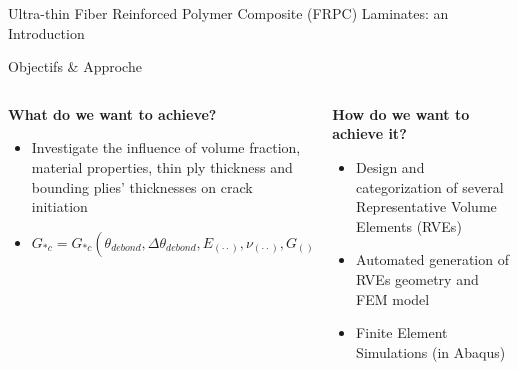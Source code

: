 \documentclass[final]{beamer}
\begin{document}
\begin{frame}
\begin{center}
\begin{minipage}{\textwidth}
\begin{block}{\rule[-0.6ex]{0pt}{50pt}\centering\LARGE Ultra-thin Fiber Reinforced Polymer Composite (FRPC) Laminates: an Introduction}
\end{block}
\end{minipage}
\end{center}

\begin{center}
	\begin{minipage}{\textwidth}
		\begin{alertblock}{\rule[-0.6ex]{0pt}{50pt}\centering\LARGE Objectifs \& Approche}
			\begin{columns}
				\begin{column}{0.475\textwidth}
   					 \begin{center}
						\textbf{What do we want to achieve?}\\[5pt]
							\begin{itemize}
    								\item Investigate the influence of volume fraction, material properties, thin ply thickness and bounding plies' thicknesses on crack initiation\\[10pt]
    								\item $G_{*c}=G_{*c}\left(\theta_{debond},\Delta\theta_{debond}, E_{\left(\cdot\cdot\right)}, \nu_{\left(\cdot\cdot\right)}, G_{\left(\right)},VF_{f}, t_{ply}, \frac{t_{ply}}{t_{bounding\ plies}}\right)$
							\end{itemize}
   					\end{center}
				\end{column}
				\begin{column}{0.475\textwidth}  %
   					\begin{center}
						\textbf{How do we want to achieve it?}\\[5pt]
						\begin{itemize}
    							\item Design and categorization of several Representative Volume Elements (RVEs)
    							\item Automated generation of RVEs geometry and FEM model
    							\item Finite Element Simulations (in Abaqus)
						\end{itemize}
   					\end{center}
				\end{column}
			\end{columns}
		\end{alertblock}
	\end{minipage}
\end{center}




\end{frame}
\end{document}
